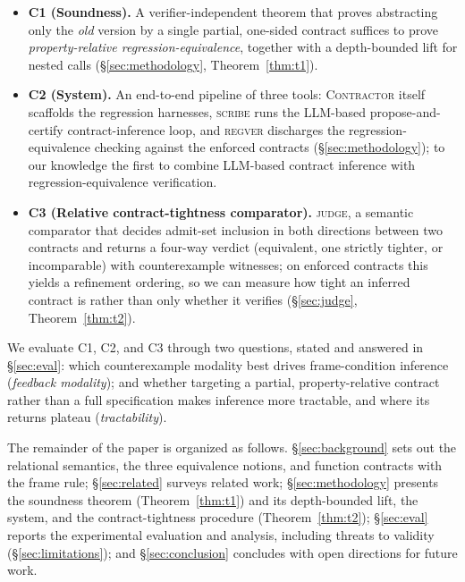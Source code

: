 \documentclass[conference]{IEEEtran}
\theoremstyle{definition}
\theoremstyle{remark}
\newcommand{\ourtool}[0]{\textsc{Contractor}}
\begin{document}
\begin{itemize}
  \item \textbf{C1 (Soundness).} A verifier-independent theorem that
    proves
    abstracting only the \emph{old} version by a single partial,
    one-sided contract suffices to prove \emph{property-relative
    regression-equivalence}, together with a depth-bounded lift for
    nested calls (\S\ref{sec:methodology}, Theorem~\ref{thm:t1}).

  \item \textbf{C2 (System).} An end-to-end pipeline of three
    tools: \ourtool{} itself scaffolds the regression harnesses,
    \textsc{scribe} runs the LLM-based propose-and-certify
    contract-inference loop,
    and \textsc{regver} discharges the regression-equivalence checking
    against the enforced contracts (\S\ref{sec:methodology}); to our
    knowledge the first to combine LLM-based contract inference with
    regression-equivalence verification.

  \item \textbf{C3 (Relative contract-tightness comparator).}
    \textsc{judge}, a semantic comparator that decides admit-set
    inclusion in both directions between two contracts and returns a
    four-way verdict (equivalent, one strictly tighter, or incomparable)
    with counterexample witnesses; on enforced contracts this yields a
    refinement ordering, so we can measure how tight an inferred
    contract is rather than only whether it verifies (\S\ref{sec:judge},
    Theorem~\ref{thm:t2}).

\end{itemize}

We evaluate C1, C2, and C3 through
two questions, stated and answered in \S\ref{sec:eval}: which
counterexample modality best drives frame-condition inference
(\emph{feedback modality}); and whether targeting a
partial, property-relative contract rather than a full specification
makes inference more tractable, and where its returns plateau
(\emph{tractability}).

The remainder of the paper is organized as follows.
\S\ref{sec:background} sets out the relational semantics, the three
equivalence notions, and function contracts with the frame rule;
\S\ref{sec:related} surveys related work; \S\ref{sec:methodology}
presents the soundness theorem (Theorem~\ref{thm:t1}) and its
depth-bounded lift, the system, and the contract-tightness procedure
(Theorem~\ref{thm:t2});
\S\ref{sec:eval} reports the experimental evaluation and analysis,
including threats to validity (\S\ref{sec:limitations}); and
\S\ref{sec:conclusion} concludes with open directions for future work.
\end{document}
